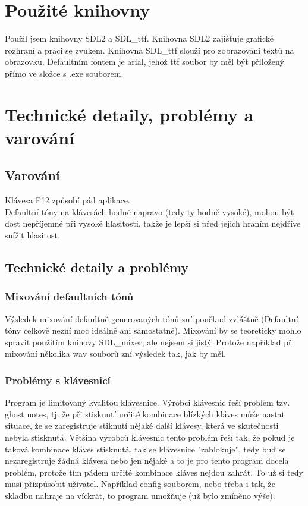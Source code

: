 \documentclass[12pt]{article}
\begin{document}
	\newpage
	\maketitle\section{Použité knihovny}
	Použil jsem knihovny SDL2 a SDL\_ttf. Knihovna SDL2 zajišťuje grafické rozhraní a práci se zvukem. Knihovna SDL\_ttf slouží pro zobrazování textů na obrazovku. Defaultním fontem je arial, jehož ttf soubor by měl být přiložený přímo ve složce s .exe souborem.
	
	\newpage
	\maketitle\section{Technické detaily, problémy a varování}
	\subsection{Varování}	
	Klávesa F12 způsobí pád aplikace.
	\\
	Defaultní tóny na klávesách hodně napravo (tedy ty hodně vysoké), mohou být dost nepříjemné při vysoké hlasitosti, takže je lepší si před jejich hraním nejdříve snížit hlasitost.
		
	\subsection{Technické detaily a problémy}
	\subsubsection{Mixování defaultních tónů}
	Výsledek mixování defaultně generovaných tónů zní poněkud zvláštně (Defaultní tóny celkově nezní moc ideálně ani samostatně). Mixování by se teoreticky mohlo spravit použitím knihovy SDL\_mixer, ale nejsem si jistý. Protože například při mixování několika wav souborů zní výsledek tak, jak by měl.
	
	\subsubsection{Problémy s klávesnicí}
	Program je limitovaný kvalitou klávesnice. Výrobci klávesnic řeší problém tzv. ghost notes, tj. že při stisknutí určité kombinace blízkých kláves může nastat situace, že se zaregistruje stiknutí nějaké další klávesy, která ve skutečnosti nebyla stisknutá. Většina výrobců klávesnic tento problém řeší tak, že pokud je taková kombinace kláves stisknutá, tak se klávesnice "zablokuje", tedy buď se nezaregistruje žádná klávesa nebo jen nějaké a to je pro tento program docela problém, protože tím pádem určité kombinace kláves nejdou zahrát. To už si tedy musí přizpůsobit uživatel. Například config souborem, nebo třeba i tak, že skladbu nahraje na víckrát, to program umožňuje (už bylo zmíněno výše).
	
\end{document}
